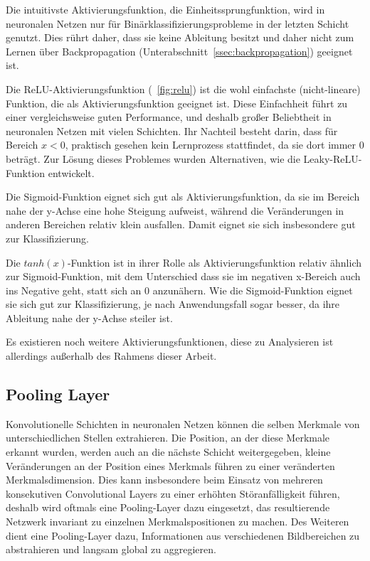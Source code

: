 Die intuitivste Aktivierungsfunktion, die Einheitssprungfunktion, wird in neuronalen Netzen nur für Binärklassifizierungsprobleme in der letzten Schicht genutzt. Dies rührt daher, dass sie keine Ableitung besitzt und daher nicht zum Lernen über Backpropagation (\vgl Unterabschnitt~\ref{ssec:backpropagation}) geeignet ist.

Die ReLU-Aktivierungsfunktion (\vgl \figurename~\ref{fig:relu}) ist die wohl einfachste (nicht-lineare) Funktion, die als Aktivierungsfunktion geeignet ist. Diese Einfachheit führt zu einer vergleichsweise guten Performance, und deshalb großer Beliebtheit in neuronalen Netzen mit vielen Schichten. Ihr Nachteil besteht darin, dass für Bereich $x<0$, praktisch gesehen kein Lernprozess stattfindet, da sie dort immer $0$ beträgt. \cite{kizrak_19} Zur Lösung dieses Problemes wurden Alternativen, wie \zB die Leaky-ReLU-Funktion entwickelt.

Die Sigmoid-Funktion eignet sich gut als Aktivierungsfunktion, da sie im Bereich nahe der y-Achse eine hohe Steigung aufweist, während die Veränderungen in anderen Bereichen relativ klein ausfallen. Damit eignet sie sich insbesondere gut zur Klassifizierung. \cite{kizrak_19}

Die $tanh(x)$-Funktion ist in ihrer Rolle als Aktivierungsfunktion relativ ähnlich zur Sigmoid-Funktion, mit dem Unterschied dass sie im negativen x-Bereich auch ins Negative geht, statt sich an $0$ anzunähern. Wie die Sigmoid-Funktion eignet sie sich gut zur Klassifizierung, je nach Anwendungsfall sogar besser, da ihre Ableitung nahe der y-Achse steiler ist. \cite{kizrak_19}

Es existieren noch weitere Aktivierungsfunktionen, diese zu Analysieren ist allerdings außerhalb des Rahmens dieser Arbeit.

\subsection{Pooling Layer}
\label{ssec:pooling_layer}

Konvolutionelle Schichten in neuronalen Netzen können die selben Merkmale von unterschiedlichen Stellen extrahieren. Die Position, an der diese Merkmale erkannt wurden, werden auch an die nächste Schicht weitergegeben, \dahe kleine Veränderungen an der Position eines Merkmals führen zu einer veränderten Merkmalsdimension. \cite{brownlee_19} Dies kann insbesondere beim Einsatz von mehreren konsekutiven Convolutional Layers zu einer erhöhten Störanfälligkeit führen, deshalb wird oftmals eine Pooling-Layer dazu eingesetzt, das resultierende Netzwerk invariant zu einzelnen Merkmalspositionen zu machen. Des Weiteren dient eine Pooling-Layer dazu, Informationen aus verschiedenen Bildbereichen zu abstrahieren und langsam global zu aggregieren. \cite{deeplearning_16}

